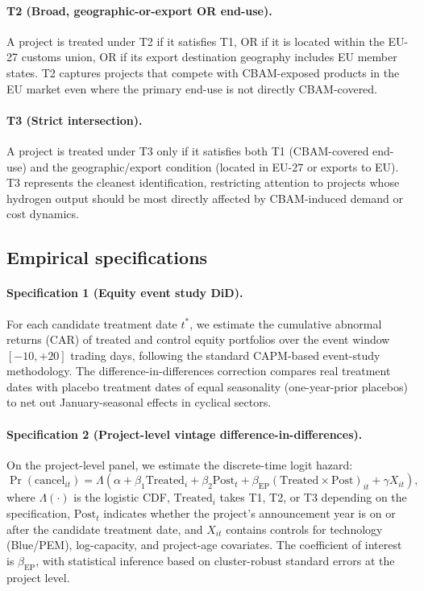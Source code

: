 \documentclass[11pt,a4paper]{article}
\newcommand{\bep}{\beta_{\mathrm{EP}}}
\begin{document}
\paragraph{T2 (Broad, geographic-or-export OR end-use).} A project is treated under T2 if it satisfies T1, OR if it is located within the EU-27 customs union, OR if its export destination geography includes EU member states. T2 captures projects that compete with CBAM-exposed products in the EU market even where the primary end-use is not directly CBAM-covered.

\paragraph{T3 (Strict intersection).} A project is treated under T3 only if it satisfies both T1 (CBAM-covered end-use) and the geographic/export condition (located in EU-27 or exports to EU). T3 represents the cleanest identification, restricting attention to projects whose hydrogen output should be most directly affected by CBAM-induced demand or cost dynamics.

\subsection{Empirical specifications}

\paragraph{Specification 1 (Equity event study DiD).} For each candidate treatment date $t^*$, we estimate the cumulative abnormal returns (CAR) of treated and control equity portfolios over the event window $[-10, +20]$ trading days, following the standard CAPM-based event-study methodology. The difference-in-differences correction compares real treatment dates with placebo treatment dates of equal seasonality (one-year-prior placebos) to net out January-seasonal effects in cyclical sectors.

\paragraph{Specification 2 (Project-level vintage difference-in-differences).} On the project-level panel, we estimate the discrete-time logit hazard:
\begin{equation}
\Pr(\text{cancel}_{it}) = \Lambda\left(\alpha + \beta_1 \text{Treated}_i + \beta_2 \text{Post}_t + \bep (\text{Treated} \times \text{Post})_{it} + \gamma X_{it}\right),
\label{eq:ch8-did}
\end{equation}
where $\Lambda(\cdot)$ is the logistic CDF, $\text{Treated}_i$ takes T1, T2, or T3 depending on the specification, $\text{Post}_t$ indicates whether the project's announcement year is on or after the candidate treatment date, and $X_{it}$ contains controls for technology (Blue/PEM), log-capacity, and project-age covariates. The coefficient of interest is $\bep$, with statistical inference based on cluster-robust standard errors at the project level.
\end{document}

